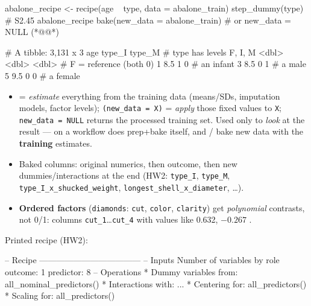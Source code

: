 \begin{rcode}
abalone_recipe <- recipe(age ~ type, data = abalone_train) %
  step_dummy(type)                                   # S2.45
abalone_recipe %
  bake(new_data = abalone_train)  # or new_data = NULL (*@@*)
\end{rcode}
\begin{routput}
# A tibble: 3,131 x 3
    age type_I type_M      # type has levels F, I, M
  <dbl>  <dbl>  <dbl>      # F = reference (both 0)
1   8.5      1      0      # an infant
3   8.5      0      1      # a male
5   9.5      0      0      # a female
\end{routput}
\begin{itemize}
\item {} = \emph{estimate} everything from the training data (means/SDs, imputation models, factor
  levels); \texttt{(new\_data = X)} = \emph{apply} those fixed values to \texttt{X}; \texttt{new\_data = NULL}
  returns the processed training set. Used only to \emph{look} at the result ---  on a workflow does
  prep+bake itself, and / bake new data with the \textbf{training} estimates.
\item Baked columns: original numerics, then outcome, then new dummies/interactions at the end
  (HW2: \texttt{type\_I}, \texttt{type\_M}, \texttt{type\_I\_x\_shucked\_weight}, \texttt{longest\_shell\_x\_diameter}, \dots).
\item \textbf{Ordered factors} (\texttt{diamonds}: \texttt{cut}, \texttt{color}, \texttt{clarity}) get \emph{polynomial}
  contrasts, not 0/1: columns \texttt{cut\_1}\dots\texttt{cut\_4} with values like 0.632, $-0.267$ .
\end{itemize}
Printed recipe (HW2):
\begin{routput}
-- Recipe ------------------------------------
-- Inputs
Number of variables by role
outcome:   1
predictor: 8
-- Operations
* Dummy variables from: all_nominal_predictors()
* Interactions with: ...
* Centering for: all_predictors()
* Scaling for: all_predictors()
\end{routput}


